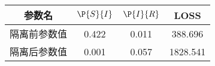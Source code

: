 \begin{tabular}{cccc}
\hline
参数名&$\P{S}{I}$&$\P{I}{R}$&LOSS\\
\hline
隔离前参数值&0.422&0.011&388.696\\
隔离后参数值&0.001&0.057&1828.541\\
\hline
\end{tabular}